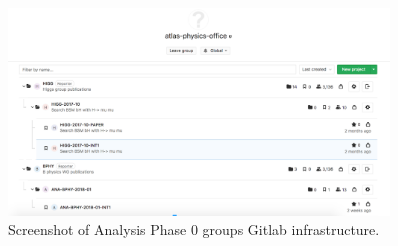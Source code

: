 \begin{figure}[ht!]
  \centering
  \includegraphics[width=0.9\textwidth]{po-ana-tree.png}
  \caption{Screenshot of Analysis Phase 0 groups Gitlab infrastructure.}
  \label{fig:po-ana-tree}
\end{figure}